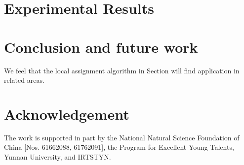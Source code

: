 \documentclass[11pt,a4paper]{article}
\begin{document}
\section{Experimental Results}

\section{Conclusion and future work}
We feel that the local assignment algorithm in Section will find
application in related areas.




\section*{Acknowledgement}
The work is
supported in part by the National Natural Science Foundation of
China [Nos. 61662088, 61762091], the Program
for Excellent Young Talents, Yunnan University, and IRTSTYN.



\end{document}
